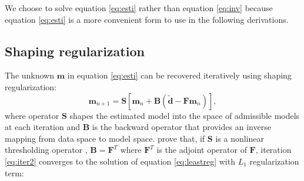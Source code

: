 We choose to solve equation \ref{eq:esti} rather than equation \ref{eq:inv} because equation \ref{eq:esti} is a more convenient form to use in the following derivations.

\subsection{Shaping regularization}
The unknown $\mathbf{m}$ in equation \ref{eq:esti} can be recovered iteratively using shaping regularization:
\begin{equation}
\label{eq:iter2}
\mathbf{m}_{n+1}=\mathbf{S}[\mathbf{m}_n+\mathbf{B}(\mathbf{\tilde{d}}-\mathbf{Fm}_n)],
\end{equation}
where operator $\mathbf{S}$ shapes the estimated model into the space of admissible models at each iteration \cite[]{fomel2,fomel3} and $\mathbf{B}$ is the backward operator that provides an inverse mapping from data space to model space.
\cite{daubechies} prove that, if $\mathbf{S}$ is a nonlinear thresholding operator \cite[]{donoho}, $\mathbf{B}=\mathbf{F}^T$ where $\mathbf{F}^T$ is the adjoint operator of $\mathbf{F}$, iteration \ref{eq:iter2} converges to the solution of equation \ref{eq:leastreg} with $L_1$ regularization term:
